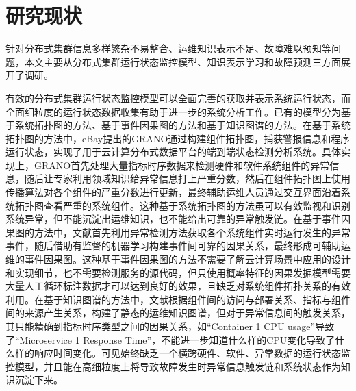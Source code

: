 \section{研究现状}
针对分布式集群信息多样繁杂不易整合、运维知识表示不足、故障难以预知等问题，本文主要从分布式集群运行状态监控模型、知识表示学习和故障预测三方面展开了调研。

有效的分布式集群运行状态监控模型可以全面完善的获取并表示系统运行状态，而全面细粒度的运行状态数据收集有助于进一步的系统分析工作。已有的模型分为基于系统拓扑图的方法、基于事件因果图的方法和基于知识图谱的方法。在基于系统拓扑图的方法中，eBay提出的GRANO\cite{wang2019grano}通过构建组件拓扑图，捕获警报信息和程序运行状态，实现了用于云计算分布式数据平台的端到端状态检测分析系统。具体实现上，GRANO首先处理大量指标时序数据来检测硬件和软件系统组件的异常信息，随后让专家利用领域知识给异常信息打上严重分数，然后在组件拓扑图上使用传播算法对各个组件的严重分数进行更新，最终辅助运维人员通过交互界面沿着系统拓扑图查看严重的系统组件。这种基于系统拓扑图的方法虽可以有效监视和识别系统异常，但不能沉淀出运维知识，也不能给出可靠的异常触发链。在基于事件因果图的方法中，文献\parencite{nie2016mining-causality-graph}首先利用异常检测方法\cite{nguyen2011pal}获取各个系统组件实时运行发生的异常事件，随后借助有监督的机器学习\cite{breiman2001randomforest}构建事件间可靠的因果关系，最终形成可辅助运维的事件因果图。这种基于事件因果图的方法不需要了解云计算场景中应用的设计和实现细节，也不需要检测服务的源代码，但只使用概率特征的因果发掘模型需要大量人工循环标注数据才可以达到良好的效果，且缺乏对系统组件拓扑关系的有效利用。在基于知识图谱的方法中，文献\parencite{qiu2020causality-mining-knowledge-graph}根据组件间的访问与部署关系、指标与组件间的来源产生关系，构建了静态的运维知识图谱，但对于异常信息间的触发关系，其只能精确到指标时序类型之间的因果关系，如“Container 1 CPU usage”导致了“Microservice 1 Response Time”\cite{qiu2020causality-mining-knowledge-graph}，不能进一步知道什么样的CPU变化导致了什么样的响应时间变化。可见始终缺乏一个横跨硬件、软件、异常数据的运行状态监控模型，并且能在高细粒度上将导致故障发生时异常信息触发链和系统状态作为知识沉淀下来。

